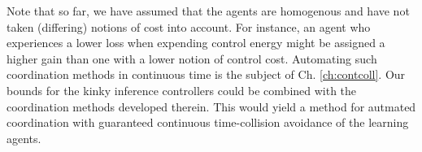 Note that so far, we have assumed that the agents are homogenous and have not taken (differing) notions of cost into account. For instance, an agent who experiences a lower loss when expending control energy might be assigned a higher gain than one with a lower notion of control cost. Automating such coordination methods in continuous time is the subject of Ch. \ref{ch:contcoll}. Our bounds for the kinky inference controllers could be combined with the coordination methods developed therein. This would yield a method for autmated coordination with guaranteed continuous time-collision avoidance of the learning agents.





